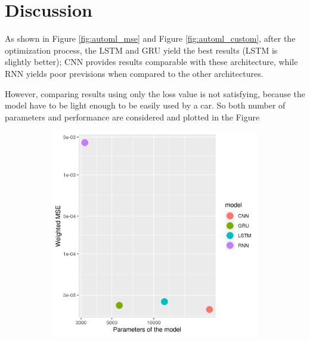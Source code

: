 \section{Discussion}
As shown in Figure \ref{fig:automl_mse} and Figure \ref{fig:automl_custom}, after the optimization process, the LSTM and GRU yield the best results (LSTM is slightly better); CNN provides results comparable with these architecture, while RNN yields poor previsions when compared to the other architectures.

However, comparing results using only the loss value is not satisfying, because the model have to be light enough to be easily used by a car. So both number of parameters and performance are considered and plotted in the Figure
\begin{figure}[!h]
  \centering
  \begin{subfigure}[b]{0.4\linewidth} \includegraphics[width=\linewidth]{imgs/performance_parameters_Weighted_MSE1.png}
  \end{subfigure}

\end{figure}
